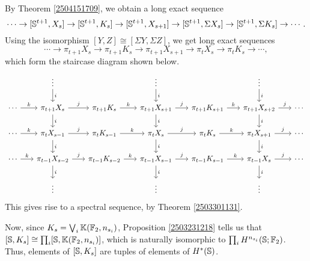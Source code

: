 \documentclass[11pt, titlepage]{article} %
\def\bb{\ensuremath\mathbb}
\numberwithin{equation}{subsection}
\theoremstyle{plain}
\theoremstyle{definition}
\begin{document}

By Theorem \ref{2504151709}, we obtain a long exact sequence
\[\cdots \to [\bb{S}^{t+1}, X_s] \to [\bb{S}^{t+1}, K_s] \to [\bb{S}^{t+1}, X_{s+1}]\to [\bb{S}^{t+1}, \Sigma X_s]\to [\bb{S}^{t+1}, \Sigma K_s] \to \cdots.\]
Using the isomorphism \([Y,Z]\cong [\Sigma Y, \Sigma Z]\), we get long exact sequences
\[\cdots \to \pi_{t+1}X_s \to \pi_{t+1}K_s \to \pi_{t+1}X_{s+1}\to \pi_t X_s\to \pi_t K_s \to \cdots,\]
which form the staircase diagram shown below.
\begin{equation}\label{2504201907}
\begin{tikzcd}[column sep=4ex, row sep=4ex]
   &  \vdots \arrow[d, "i"] &  & \vdots \arrow[d, "i"] &  & \vdots \arrow[d, "i"] & \\
 \cdots \arrow[r, "k"] & \pi_{t+1}X_s \arrow[d, "i"] \arrow[r, "j"] & \pi_{t+1}K_s  \arrow[r, "k"] & \pi_{t+1}X_{s+1} \arrow[d, "i"] \arrow[r, "j"] & \pi_{t+1}K_{s+1} \arrow[r, "k"] & \pi_{t+1}X_{s+2} \arrow[d, "i"] \arrow[r, "j"] & \cdots \\
 \cdots \arrow[r, "k"] & \pi_t X_{s-1} \arrow[d, "i"] \arrow[r, "j"] & \pi_t K_{s-1}  \arrow[r, "k"] & \pi_t X_s \arrow[d, "i"] \arrow[r, "j"] & \pi_t K_s \arrow[r, "k"] & \pi_t X_{s+1} \arrow[d, "i"] \arrow[r, "j"] & \cdots \\
 \cdots \arrow[r, "k"] & \pi_{t-1}X_{s-2}  \arrow[d, "i"] \arrow[r, "j"] & \pi_{t-1}K_{s-2}  \arrow[r, "k"] & \pi_{t-1}X_{s-1} \arrow[d, "i"] \arrow[r, "j"] & \pi_{t-1}K_{s-1} \arrow[r, "k"] & \pi_{t-1}X_s \arrow[d, "i"] \arrow[r, "j"] & \cdots \\
 & \vdots &  & \vdots & & \vdots &
\end{tikzcd}
\end{equation}
This gives rise to a spectral sequence, by Theorem \ref{2503301131}.

Now, since \(K_s = \bigvee_i \bb{K}(\bb{F}_2, n_{s_i})\), Proposition \ref{2503231218} tells us that \([\bb{S}, K_s]\cong \prod_i[\bb{S}, \bb{K}(\bb{F}_2, n_{s_i})]\), which is naturally isomorphic to \(\prod_i H^{n_{s_i}}(\bb{S}; \bb{F}_2)\). Thus, elements of \([\bb{S}, K_s]\) are tuples of elements of \(H^*(\bb{S})\).
\end{document}
